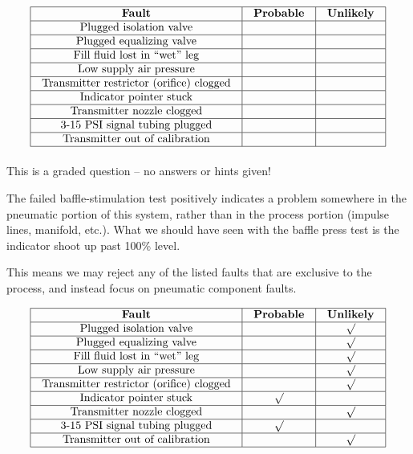 $$\vbox{\offinterlineskip
\halign{\strut
\vrule \quad\hfil # \ \hfil & 
\vrule \quad\hfil # \ \hfil & 
\vrule \quad\hfil # \ \hfil \vrule \cr
\noalign{\hrule}
%
{\bf Fault} & {\bf Probable} & {\bf Unlikely} \cr
%
\noalign{\hrule}
%
Plugged isolation valve &  & \cr
%
\noalign{\hrule}
%
Plugged equalizing valve &  & \cr
%
\noalign{\hrule}
%
Fill fluid lost in ``wet'' leg &  & \cr
%
\noalign{\hrule}
%
Low supply air pressure &  & \cr
%
\noalign{\hrule}
%
Transmitter restrictor (orifice) clogged &  & \cr
%
\noalign{\hrule}
%
Indicator pointer stuck &  & \cr
%
\noalign{\hrule}
%
Transmitter nozzle clogged &  & \cr
%
\noalign{\hrule}
%
3-15 PSI signal tubing plugged &  & \cr
%
\noalign{\hrule}
%
Transmitter out of calibration &  & \cr
%
\noalign{\hrule}
} %
}$$ %

\vfil 

\eject






This is a graded question -- no answers or hints given!







The failed baffle-stimulation test positively indicates a problem somewhere in the pneumatic portion of this system, rather than in the process portion (impulse lines, manifold, etc.).  What we should have seen with the baffle press test is the indicator shoot up past 100\% level.

This means we may reject any of the listed faults that are exclusive to the process, and instead focus on pneumatic component faults.


$$\vbox{\offinterlineskip
\halign{\strut
\vrule \quad\hfil # \ \hfil & 
\vrule \quad\hfil # \ \hfil & 
\vrule \quad\hfil # \ \hfil \vrule \cr
\noalign{\hrule}
%
{\bf Fault} & {\bf Probable} & {\bf Unlikely} \cr
%
\noalign{\hrule}
%
Plugged isolation valve & & $\surd$ \cr
%
\noalign{\hrule}
%
Plugged equalizing valve &  & $\surd$ \cr
%
\noalign{\hrule}
%
Fill fluid lost in ``wet'' leg &  & $\surd$ \cr
%
\noalign{\hrule}
%
Low supply air pressure &  & $\surd$ \cr
%
\noalign{\hrule}
%
Transmitter restrictor (orifice) clogged &  & $\surd$ \cr
%
\noalign{\hrule}
%
Indicator pointer stuck & $\surd$ & \cr
%
\noalign{\hrule}
%
Transmitter nozzle clogged &  & $\surd$ \cr
%
\noalign{\hrule}
%
3-15 PSI signal tubing plugged & $\surd$  & \cr
%
\noalign{\hrule}
%
Transmitter out of calibration &  & $\surd$ \cr
%
\noalign{\hrule}
} %
}$$ %





